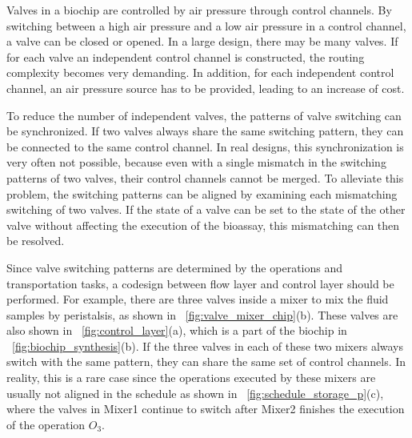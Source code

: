 

Valves in a biochip are controlled by air pressure through 
control channels. By switching between a high air pressure and 
a low air pressure in a control channel, a valve can be
closed or opened. In a large design, there may be many valves. If for each
valve an independent control channel is constructed, the routing complexity
becomes very demanding. In addition, for each independent control channel, an
air pressure source 
has to be provided, leading to an
increase of
cost. %

To reduce the number of independent valves, the patterns of valve switching
can be synchronized. If two valves always share the same switching pattern, they can
be connected to the same control channel. In real designs, 
this synchronization is very often not possible, because 
even with a single mismatch in the switching patterns of two valves, 
their control channels
cannot be merged. To alleviate this problem, the switching patterns can be
aligned by examining each 
mismatching switching of two valves.
If the state of a valve can be set to the state of the other valve
without affecting the execution of the bioassay, this mismatching can then be
resolved. 

Since valve switching patterns are determined by the operations and
transportation tasks, a codesign between flow layer and control
layer should be performed. For example,  
there are three valves inside a mixer to mix the fluid samples by peristalsis,
as shown in \figname~\ref{fig:valve_mixer_chip}(b). 
These valves are also shown in \figname~\ref{fig:control_layer}(a), 
which is a
part of the biochip in %
\figname~\ref{fig:biochip_synthesis}(b). 
If the three valves in each of these two mixers always switch with the same 
pattern, they can share the same set of control channels. 
In reality, this is a rare case since the operations executed by these
mixers are usually not aligned in the schedule as shown in
\figname~\ref{fig:schedule_storage_p}(c), where the valves in Mixer1 continue
to switch after Mixer2 finishes 
the execution of the operation $O_3$.

